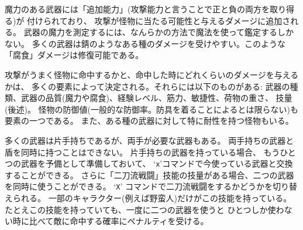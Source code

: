 魔力のある武器には「追加能力」(攻撃能力と言うことで正と負の両方を取り得る)が
付けられており、
攻撃が怪物に当たる可能性と与えるダメージに追加される。
武器の魔力を測定するには、なんらかの方法で魔法を使って鑑定するしかない。
多くの武器は錆のようなある種のダメージを受けやすい。このような
「腐食」ダメージは修復可能である。

攻撃がうまく怪物に命中するかと、命中した時にどれくらいのダメージを与えるかは、
多くの要素によって決定される。それらには以下のものがある:
武器の種類、武器の品質(魔力や腐食)、経験レベル、筋力、敏捷性、荷物の重さ、
技量(後述)。
怪物の防御値(一般的な防御率。防具を着ることによるとは限らない)も要素の一つである。
また、ある種の武器に対して特に耐性を持つ怪物もいる。

多くの武器は片手持ちであるが、両手が必要な武器もある。
両手持ちの武器と盾を同時に持つことはできない。
片手持ちの武器を持っている場合、
もうひとつの武器を予備として準備しておいて、
`{\tt x}'コマンドで今使っている武器と交換することができる。
さらに「二刀流戦闘」技能の技量がある場合、二つの武器を同時に使うことができる。
`{\tt X}' コマンドで二刀流戦闘をするかどうかを切り替えられる。
一部のキャラクター(例えば野蛮人)だけがこの技能を持っている。
たとえこの技能を持っていても、一度に二つの武器を使うと
ひとつしか使わない時に比べて敵に命中する確率にペナルティを受ける。

